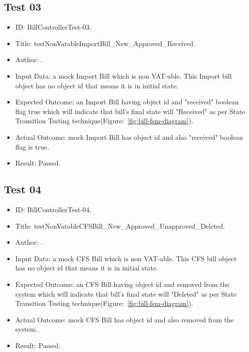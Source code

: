 \documentclass[12pt]{article}
\makeatletter
\let\theauthor\@author
\makeatother
\begin{document}
\subsection{Test 03}
\begin{itemize}
	
    \item ID: BillControllerTest-03.
    
    \item Title: testNonVatableImportBill\_New\_Approved\_Received.
    
    \item Author: \theauthor.
    
    \item Input Data: a mock Import Bill which is non VAT-able. This Import bill object has no object id that means it is in initial state.
    
    \item Expected Outcome: an Import Bill having object id and "received" boolean flag true which will indicate that bill's final state will "Received" as per State Transition Testing technique(Figure:~\ref{fig:bill-fsm-diagram}).
    
    \item Actual Outcome: mock Import Bill has object id and also "received" boolean flag is true.
    
    \item Result: Passed.

\end{itemize}

\subsection{Test 04}
\begin{itemize}
	
    \item ID: BillControllerTest-04.
    
    \item Title: testNonVatableCFSBill\_New\_Approved\_Unapproved\_Deleted.
    
    \item Author: \theauthor.
    
    \item Input Data: a mock CFS Bill which is non VAT-able. This CFS bill object has no object id that means it is in initial state.
    
    \item Expected Outcome: an CFS Bill having object id and removed from the system which will indicate that bill's final state will "Deleted" as per State Transition Testing technique(Figure:~\ref{fig:bill-fsm-diagram}).
    
    \item Actual Outcome: mock CFS Bill has object id and also removed from the system.
    
    \item Result: Passed.

\end{itemize}
\end{document}
